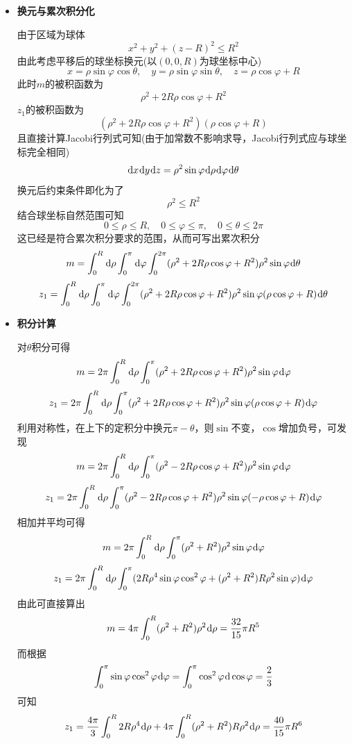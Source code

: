 \documentclass[a4paper,UTF8,fontset=windows,AutoFakeBold]{ctexart}
\newcommand*{\dr}{\hspace{0.07em}\mathrm{d}}
\theoremstyle{ex}
\begin{document}
\begin{enumerate}
{\begin{itemize}
            \item \textbf{换元与累次积分化}
            
            由于区域为球体
            $$x^2+y^2+(z-R)^2\le R^2$$
            由此考虑平移后的球坐标换元(以$(0,0,R)$为球坐标中心)
            $$x=\rho\sin\varphi\cos\theta,\quad y=\rho\sin\varphi\sin\theta,\quad z=\rho\cos\varphi+R$$
            此时$m$的被积函数为
            $$\rho^2+2R\rho\cos\varphi+R^2$$
            $z_1$的被积函数为
            $$(\rho^2+2R\rho\cos\varphi+R^2)(\rho\cos\varphi+R)$$
            且直接计算Jacobi行列式可知(由于加常数不影响求导，Jacobi行列式应与球坐标完全相同)
            $$\dr x\dr y\dr z=\rho^2\sin\varphi\dr\rho\dr\varphi\dr\theta$$
            换元后约束条件即化为了
            $$\rho^2\le R^2$$
            结合球坐标自然范围可知
            $$0\le\rho\le R,\quad0\le\varphi\le\pi,\quad0\le\theta\le2\pi$$
            这已经是符合累次积分要求的范围，从而可写出累次积分
            $$m=\int_0^R\dr\rho\int_0^\pi\dr\varphi\int_0^{2\pi}(\rho^2+2R\rho\cos\varphi+R^2)\rho^2\sin\varphi\dr\theta$$
            $$z_1=\int_0^R\dr\rho\int_0^\pi\dr\varphi\int_0^{2\pi}(\rho^2+2R\rho\cos\varphi+R^2)\rho^2\sin\varphi(\rho\cos\varphi+R)\dr\theta$$
            
            \item \textbf{积分计算}
            
            对$\theta$积分可得
            $$m=2\pi\int_0^R\dr\rho\int_0^\pi(\rho^2+2R\rho\cos\varphi+R^2)\rho^2\sin\varphi\dr\varphi$$
            $$z_1=2\pi\int_0^R\dr\rho\int_0^\pi(\rho^2+2R\rho\cos\varphi+R^2)\rho^2\sin\varphi(\rho\cos\varphi+R)\dr\varphi$$
            利用对称性，在上下的定积分中换元$\pi-\theta$，则$\sin$不变，$\cos$增加负号，可发现
            $$m=2\pi\int_0^R\dr\rho\int_0^\pi(\rho^2-2R\rho\cos\varphi+R^2)\rho^2\sin\varphi\dr\varphi$$
            $$z_1=2\pi\int_0^R\dr\rho\int_0^\pi(\rho^2-2R\rho\cos\varphi+R^2)\rho^2\sin\varphi(-\rho\cos\varphi+R)\dr\varphi$$
            相加并平均可得
            $$m=2\pi\int_0^R\dr\rho\int_0^\pi(\rho^2+R^2)\rho^2\sin\varphi\dr\varphi$$
            $$z_1=2\pi\int_0^R\dr\rho\int_0^\pi(2R\rho^4\sin\varphi\cos^2\varphi+(\rho^2+R^2)R\rho^2\sin\varphi)\dr\varphi$$
            由此可直接算出
            $$m=4\pi\int_0^R(\rho^2+R^2)\rho^2\dr\rho=\frac{32}{15}\pi R^5$$
            而根据
            $$\int_0^\pi\sin\varphi\cos^2\varphi\dr\varphi=\int_0^\pi\cos^2\varphi\dr\cos\varphi=\frac{2}{3}$$
            可知
            $$z_1=\frac{4\pi}{3}\int_0^R2R\rho^4\dr\rho+4\pi\int_0^R(\rho^2+R^2)R\rho^2\dr\rho=\frac{40}{15}\pi R^6$$
            

\end{itemize}}
\end{enumerate}
\end{document}
